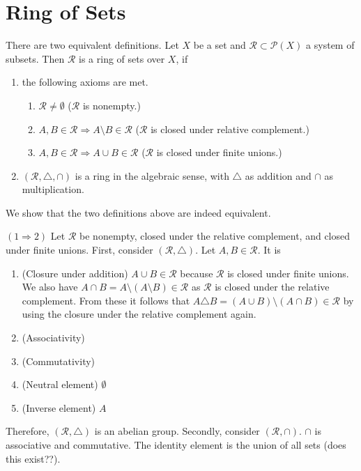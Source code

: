 \section{Ring of Sets}
\begin{definition}
    There are two equivalent definitions. Let {\color{mathif}\(X\)} be a {\color{mathif}set} and {\color{mathif}\(\mathcal{R} \subset \mathcal{P}(X)\)} a {\color{mathif}system of subsets}. Then {\color{maththen} \(\mathcal{R}\)}  is a {\color{maththen}ring of sets over \(X\)}, if
    \begin{enumerate}
        \item the following axioms are met.
        \begin{enumerate}
            \item \(\mathcal{R} \neq \emptyset\) (\(\mathcal{R}\) is {\color{mathrem}nonempty.})
            \item \(A, B \in \mathcal{R} \Rightarrow A \setminus B \in \mathcal{R}\) (\(\mathcal{R}\) is {\color{mathrem}closed under relative complement}.)
            \item \(A, B \in \mathcal{R} \Rightarrow A \cup B \in \mathcal{R}\) (\(\mathcal{R}\) is {\color{mathrem}closed under finite unions}.)
        \end{enumerate}
        \item \((\mathcal{R}, \triangle, \cap)\) is a ring in the algebraic sense, with \(\triangle\) as addition and \(\cap\) as multiplication.
    \end{enumerate}
\end{definition}
\begin{Proof}
    We show that the two definitions above are indeed equivalent.

    \((1 \Rightarrow 2)\) Let \(\mathcal{R}\) be nonempty, closed under the relative complement, and closed under finite unions. First, consider \((\mathcal{R}, \triangle)\). Let \(A, B \in \mathcal{R}\). It is
    \begin{enumerate}
        \item (Closure under addition) \(A \cup B \in \mathcal{R}\) because \(\mathcal{R}\) is closed under finite unions. We also have \(A \cap B = A \setminus (A \setminus B) \in \mathcal{R}\) as \(\mathcal{R}\) is closed under the relative complement. From these it follows that \( A \triangle B = (A \cup B) \setminus (A \cap B) \in \mathcal{R}\) by using the closure under the relative complement again.
        \item (Associativity)
        \item (Commutativity)
        \item (Neutral element) \(\emptyset\)
        \item (Inverse element) \(A\)
    \end{enumerate}
    Therefore, \((\mathcal{R}, \triangle)\) is an abelian group. Secondly, consider \((\mathcal{R}, \cap)\). \(\cap\) is associative and commutative. The identity element is the union of all sets (does this exist??).
\end{Proof}
